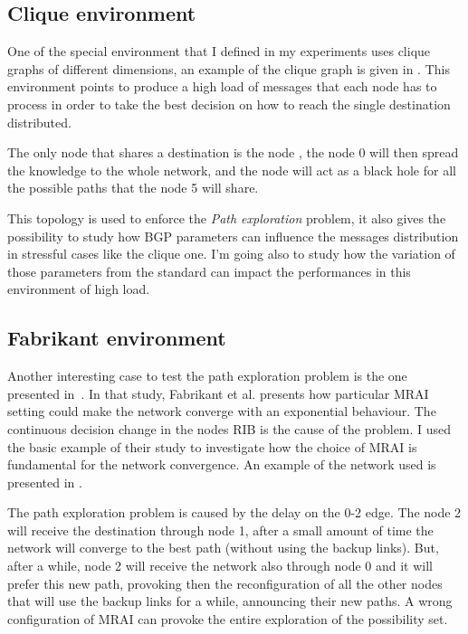 \subsection{Clique environment}
\label{subsec:clique_env}

One of the special environment that I defined in my experiments uses clique
graphs of different dimensions, an example of the clique graph is given in
.
This environment points to produce a high load of messages that each node has
to process in order to take the best decision on how to reach the single
destination distributed.

The only node that shares a destination is the node , the node
\num{0} will then spread the knowledge to the whole network, and the node
 will act as a black hole for all the possible paths
that the node \num{5} will share.

This topology is used to enforce the \textit{Path exploration} problem, it also
gives the possibility to study how \ac{BGP} parameters can influence the messages
distribution in stressful cases like the clique one.
I'm going also to study how the variation of those parameters from the standard
can impact the performances in this environment of high load.

\subsection{Fabrikant environment}
\label{subsec:fabrikant_env}

Another interesting case to test the path exploration problem is the one
presented in~\cite{fabrikant2011there}.
In that study, Fabrikant et al. presents how particular \ac{MRAI} setting could
make the network converge with an exponential behaviour. The continuous decision
change in the nodes \ac{RIB} is the cause of the problem.
I used the basic example of their study to investigate how the choice of \ac{MRAI}
is fundamental for the network convergence.
An example of the network used is presented in .

The path exploration problem is caused by the delay on the \num{0}-\num{2}
edge. The node \num{2} will receive the destination through node \num{1}, after a small amount
of time the network will converge to the best path (without using the backup links).
But, after a while, node \num{2} will receive the network also through node \num{0}
and it will prefer this new path, provoking then the reconfiguration of all
the other nodes that will use the backup links for a while, announcing their
new paths.
A wrong configuration of \ac{MRAI} can provoke the entire exploration of the
possibility set.

